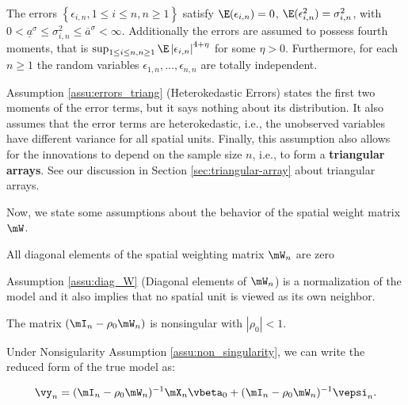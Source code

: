 \documentclass[english,12pt]{book}\usepackage[]{graphicx}\usepackage[]{xcolor}
\begin{document}
\begin{assumption}\label{assu:errors_triang}
The errors  $\left\lbrace \epsilon_{i,n}, 1 \leq i \leq n, n\geq 1\right\rbrace$ satisfy $\E(\epsilon_{i,n})= 0$, $\E(\epsilon_{i,n}^2) = \sigma^2_{i,n}$, with $0 < \underline{a}^\sigma \leq \sigma^2_{i,n}\leq \overline{a}^\sigma<\infty$. Additionally the errors are assumed to possess fourth moments, that is $\sup_{1\leq i \leq n, n\geq 1}\E\left|\epsilon_{i, n}\right|^{4 + \eta}$ for some $\eta > 0$.  Furthermore, for each $n\geq 1$ the random variables $\epsilon_{1, n}, ..., \epsilon_{n, n}$ are totally independent. 
\end{assumption}

Assumption \ref{assu:errors_triang} (Heterokedastic Errors) states the first two moments of the error terms, but it says nothing about its distribution. It also assumes that the error terms are heterokedastic, i.e., the unobserved variables have different variance for all spatial units. Finally, this assumption also allows for the innovations to depend on the sample size $n$, i.e., to form a \textbf{triangular arrays}. See our discussion in Section \ref{sec:triangular-array} about triangular arrays. 

Now, we state some assumptions about the behavior of the spatial weight matrix $\mW$.

\begin{assumption}\label{assu:diag_W}
All diagonal elements of the spatial weighting matrix $\mW_n$ are zero
\end{assumption}

Assumption \ref{assu:diag_W} (Diagonal elements of $\mW_n$) is a normalization of the model and it also implies that no spatial unit is viewed as its own neighbor. 

\begin{assumption}\label{assu:non_singularity}
The matrix $(\mI_n - \rho_0\mW_n)$ is nonsingular with $\left|\rho_0 \right|<1$.
\end{assumption}

Under Nonsigularity Assumption \ref{assu:non_singularity}, we can write the reduced form of the true model as:

\begin{equation*}
  \vy_n = (\mI_n - \rho_0\mW_n)^{-1}\mX_n\vbeta_0 + (\mI_n - \rho_0\mW_n)^{-1}\vepsi_n.
\end{equation*}
\end{document}
